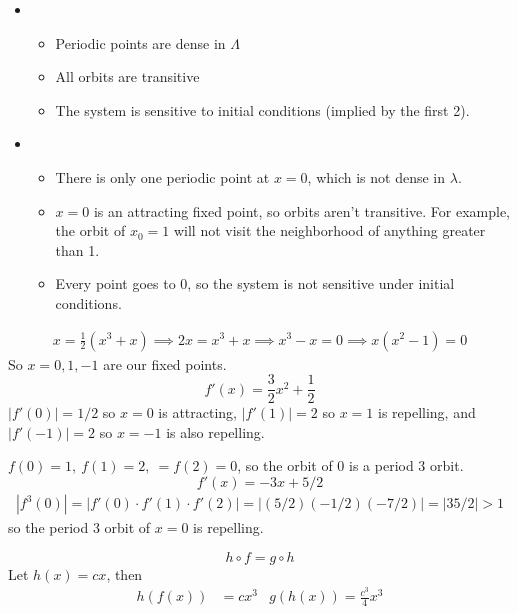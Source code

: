 \documentclass[12pt]{article}
\newenvironment{problem}[2][Problem]{\begin{trivlist}
\item[\hskip \labelsep {\bfseries #1} \hskip \labelsep {\bfseries #2.}]}{\end{trivlist}}
\begin{document}
\begin{itemize}
	\item[(a)]
		\begin{itemize}
			\item Periodic points are dense in $\Lambda$
			\item All orbits are transitive
			\item The system is sensitive to initial conditions (implied by the first 2).
		\end{itemize}
	\item[(b)]
		\begin{itemize}
			\item There is only one periodic point at $x = 0$, which is not dense in $\lambda$.
			\item $x = 0$ is an attracting fixed point, so orbits aren't transitive. For example, the orbit of $x_0 = 1$ will not visit the neighborhood of anything greater than 1.
			\item Every point goes to 0, so the system is not sensitive under initial conditions.
		\end{itemize}
\end{itemize}
\begin{problem}{5}
	
\end{problem}
\begin{align*}
	x = \frac{1}{2}(x^3 + x) \implies 2x = x^3 + x \implies x^3 - x = 0 \implies x(x^2 - 1) = 0
\end{align*}
So $x = 0,1,-1$ are our fixed points.
\[
	f'(x) = \frac{3}{2}x^2 + \frac{1}{2}
\]
$|f'(0)| = 1/2$ so $x = 0$ is attracting, $|f'(1)| = 2$ so $x = 1$ is repelling, and $|f'(-1)| = 2$ so $x = -1$ is also repelling.
\begin{problem}{6}
	
\end{problem}
$f(0) = 1,~f(1) = 2,~= f(2) = 0$, so the orbit of 0 is a period 3 orbit.
\[
	f'(x) = -3x + 5/2
\]
\begin{align*}
	|f^3(0)| = |f'(0)\cdot f'(1)\cdot f'(2)| = |(5/2)(-1/2)(-7/2)| = |35/2| > 1
\end{align*}
so the period 3 orbit of $x = 0$ is repelling.
\begin{problem}{7}
	
\end{problem}
\[
	h \circ f = g \circ h
\]
Let $h(x) = cx$, then
\begin{align*}
	h(f(x)) &= cx^3 & g(h(x)) = \frac{c^3}{4}x^3
\end{align*}
\end{document}
